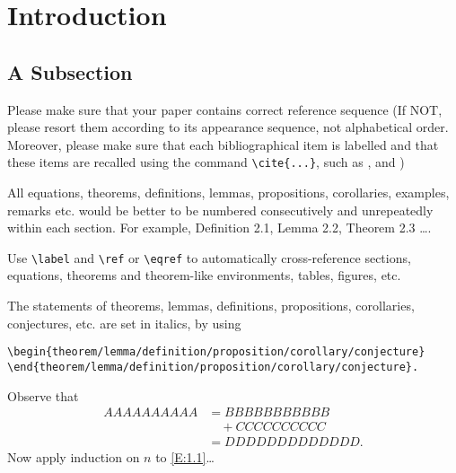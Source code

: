 \documentclass{amse-new}
\numberwithin{equation}{section} %
\begin{document}



\section{Introduction}

\subsection{A Subsection}

Please make sure that your paper contains correct reference
sequence (If NOT, please resort them according to its appearance
sequence, not alphabetical order. Moreover, please make sure that
each bibliographical item is labelled and that these items are
recalled using the command \verb|\cite{...}|, such as \cite{ref1},
and \cite{ref2,ref3,ref4,ref5})

All equations, theorems, definitions, lemmas, propositions,
corollaries, examples, remarks etc. would be better to be numbered
consecutively and unrepeatedly within each section. For example,
Definition 2.1, Lemma 2.2, Theorem 2.3 \ldots.

Use \verb|\label| and \verb|\ref| or \verb|\eqref| to
automatically cross-reference sections, equations, theorems and
theorem-like environments, tables, figures, etc.

\begin{theorem}\label{th:1.1} %
The statements of theorems, lemmas, definitions, propositions,
corollaries, conjectures, etc. are set in italics, by using
\begin{verbatim}
\begin{theorem/lemma/definition/proposition/corollary/conjecture}
\end{theorem/lemma/definition/proposition/corollary/conjecture}.
\end{verbatim}
\end{theorem}

\begin{prof}  %
Observe that
\begin{align}\label{E:1.1}
AAAAAAAAAA &= BBBBBBBBBBB\nonumber \\
           &\quad + CCCCCCCCCC\nonumber \\
           &= DDDDDDDDDDDDD.
\end{align}
Now apply induction on $n$ to \eqref{E:1.1}\ldots
\end{prof}
\end{document}
